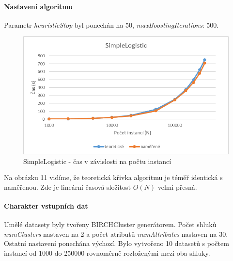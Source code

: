 \documentclass[12pt]{article}
\begin{document}
\paragraph{Nastavení algoritmu}
Parametr \textit{heuristicStop} byl ponechán na 50, \textit{maxBoostingIterations}: 500.
\begin{figure}[hbp]
  \centering
  \includegraphics[scale=1]{img/logistic.png}
  \caption{SimpleLogistic - čas v závislosti na počtu instancí}
\end{figure}
Na obrázku 11 vidíme, že teoretická křivka algoritmu je téměř identická s naměřenou. Zde je lineární časová složitost $O(N)$ velmi přesná.

\newpage
{}
\paragraph{Charakter vstupních dat}
Umělé datasety byly tvořeny BIRCHCluster generátorem. Počet shluků \textit{numClusters} nastaven na 2 a počet atributů \textit{numAttributes} nastaven na 30. Ostatní nastavení ponechána výchozí. Bylo vytvořeno 10 datasetů s počtem instancí od 1000 do 250000 rovnoměrně rozloženými mezi oba shluky.
\end{document}
